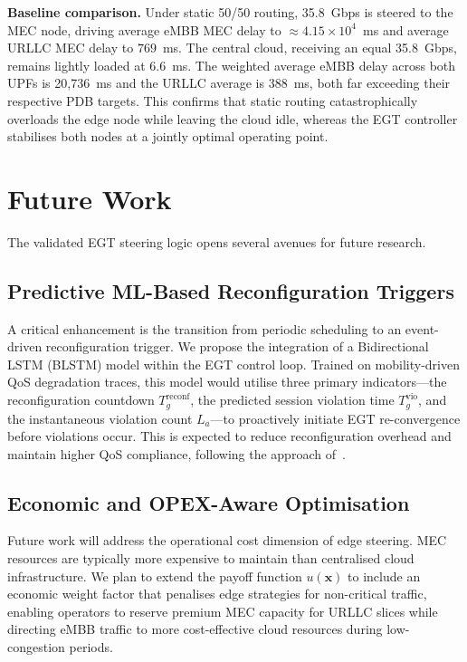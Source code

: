 \documentclass[conference]{IEEEtran}
\begin{document}
\textbf{Baseline comparison.}
Under static 50/50 routing, 35.8~Gbps is steered to the MEC node,
driving average eMBB MEC delay to $\approx 4.15\times10^4$~ms and
average URLLC MEC delay to $769$~ms. The central cloud, receiving
an equal 35.8~Gbps, remains lightly loaded at 6.6~ms. The
weighted average eMBB delay across both UPFs is 20,736~ms and
the URLLC average is 388~ms, both far exceeding their respective
PDB targets. This confirms that static routing catastrophically
overloads the edge node while leaving the cloud idle, whereas
the EGT controller stabilises both nodes at a jointly optimal
operating point.

\section{Future Work}
\label{sec:future}

The validated EGT steering logic opens several avenues
for future research.

\subsection{Predictive ML-Based Reconfiguration Triggers}

A critical enhancement is the transition from periodic
scheduling to an event-driven reconfiguration trigger.
We propose the integration of a Bidirectional LSTM
(BLSTM) model within the EGT control loop. Trained on
mobility-driven QoS degradation traces, this model
would utilise three primary indicators---the
reconfiguration countdown $T_g^{\text{reconf}}$, the
predicted session violation time $T_{g}^{\text{vio}}$,
and the instantaneous violation count $L_a$---to
proactively initiate EGT re-convergence before
violations occur. This is expected to reduce
reconfiguration overhead and maintain higher QoS
compliance, following the approach of~\cite{LeyvaUPC2023}.

\subsection{Economic and OPEX-Aware Optimisation}

Future work will address the operational cost dimension
of edge steering. MEC resources are typically more
expensive to maintain than centralised cloud infrastructure.
We plan to extend the payoff function $u(\mathbf{x})$
to include an economic weight factor that penalises
edge strategies for non-critical traffic, enabling
operators to reserve premium MEC capacity for URLLC
slices while directing eMBB traffic to more
cost-effective cloud resources during low-congestion
periods.
\end{document}
